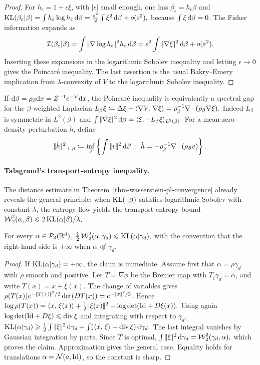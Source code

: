 \begin{proof}
For \(h_\epsilon=1+\epsilon\xi\), with \(|\epsilon|\) small enough, one has \(\beta_\epsilon=h_\epsilon\beta\) and
\(\operatorname{KL}(\beta_\varepsilon|\beta) = \int h_\varepsilon\log h_\varepsilon\,\mathrm{d}\beta = \frac{\varepsilon^2}{2}\int\xi^2\,\mathrm{d}\beta+o(\varepsilon^2),\)
because \(\int\xi\,\mathrm{d}\beta=0\). The Fisher information expands as
\[
\mathcal I(\beta_\varepsilon|\beta)
=
\int|\!| \nabla\log h_\varepsilon |\!|^2 h_\varepsilon\,\mathrm{d}\beta
=
\varepsilon^2\int|\!| \nabla\xi |\!|^2\,\mathrm{d}\beta+o(\varepsilon^2).
\]
Inserting these expansions in the logarithmic Sobolev inequality and letting \(\epsilon\to0\) gives the Poincar\'e inequality. The last assertion is the usual Bakry--Emery implication from \(\lambda\)-convexity of \(V\) to the logarithmic Sobolev inequality.
\end{proof}
If \(\mathrm{d}\beta=\rho_\beta\mathrm{d} x=Z^{-1}e^{-V}\mathrm{d} x\), the Poincar\'e inequality is equivalently a spectral gap for the \(\beta\)-weighted Laplacian
\(L_\beta\xi \coloneqq \Delta\xi-\langle \nabla V,\,\nabla\xi\rangle = \rho_\beta^{-1}\nabla\cdot(\rho_\beta\nabla\xi).\)
Indeed \(L_\beta\) is symmetric in \(L^2(\beta)\) and
\(\int|\!| \nabla\xi |\!|^2\,\mathrm{d}\beta = \langle \xi,-L_\beta\xi\rangle_{L^2(\beta)}.\)
For a mean-zero density perturbation \(\dot h\), define
\[
|\!| \dot h |\!|_{-1,\beta}^2
\coloneqq
\inf_{v}
\left\{
\int|\!| v |\!|^2\,\mathrm{d}\beta
\;:\;
\dot h=-\rho_\beta^{-1}\nabla\cdot(\rho_\beta v)
\right\}.
\]
\paragraph{Talagrand's transport-entropy inequality.}
The distance estimate in Theorem~\ref{thm-wasserstein-pl-convergence} already reveals the general principle: when \(\operatorname{KL}(\cdot|\beta)\) satisfies logarithmic Sobolev with constant \(\lambda\), the entropy flow yields the transport-entropy bound \(\operatorname{\mathcal{W}}_2^2(\alpha,\beta)\leqslant2\operatorname{KL}(\alpha|\beta)/\lambda\).

\begin{prop}\label{prop-gaussian-talagrand-t2}
For every $\alpha\in\mathcal{P}_2(\mathbb{R}^d)$, \(\frac12\operatorname{\mathcal{W}}_2^2(\alpha,\gamma_d) \leqslant \operatorname{KL}(\alpha|\gamma_d),\)
with the convention that the right-hand side is \(+\infty\) when \(\alpha\not\ll\gamma_d\).
\end{prop}
\begin{proof}
If \(\operatorname{KL}(\alpha|\gamma_d)=+\infty\), the claim is immediate. Assume first that \(\alpha=\rho\gamma_d\) with \(\rho\) smooth and positive. Let $T=\nabla\phi$ be the Brenier map with $T_\sharp\gamma_d=\alpha$, and write $T(x)=x+\xi(x)$. The change of variables gives
\(\rho(T(x))e^{-|\!| T(x) |\!|^2/2}\det(DT(x)) = e^{-|\!| x |\!|^2/2}.\)
Hence
\(\log \rho(T(x)) = \langle x,\,\xi(x)\rangle + \frac12|\!| \xi(x) |\!|^2 - \log\det(\mathrm{Id}+D\xi(x)).\)
Using again $\log\det(\mathrm{Id}+D\xi)\leqslant\operatorname{div}\xi$ and integrating with respect to $\gamma_d$, \(\operatorname{KL}(\alpha|\gamma_d) \geqslant \frac12\int|\!| \xi |\!|^2\,\mathrm{d}\gamma_d + \int(\langle x,\,\xi\rangle-\operatorname{div}\xi)\,\mathrm{d}\gamma_d.\)
The last integral vanishes by Gaussian integration by parts. Since $T$ is optimal, \(\int|\!| \xi |\!|^2\,\mathrm{d}\gamma_d=\operatorname{\mathcal{W}}_2^2(\gamma_d,\alpha),\)
which proves the claim. Approximation gives the general case. Equality holds for translations \(\alpha=\mathcal{N}(a,\mathrm{Id})\), so the constant is sharp.
\end{proof}
